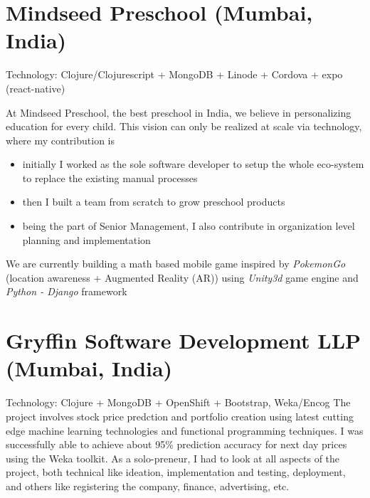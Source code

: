 \documentclass[11pt,a4paper,sans]{moderncv} %
\begin{document}
\section{Mindseed Preschool (Mumbai, India)}
         {}{Technology: Clojure/Clojurescript + MongoDB + Linode + Cordova + expo (react-native)}
         {At Mindseed Preschool, the best preschool in India, we believe in personalizing education for every child. This vision can only be realized at scale via technology, where my contribution is
           \begin{itemize}
           \item initially I worked as the sole software developer to setup the whole eco-system to replace the existing manual processes
           \item then I built a team from scratch to grow preschool products
           \item being the part of Senior Management, I also contribute in organization level planning and implementation
           \end{itemize}
         We are currently building a math based mobile game inspired by \textit{PokemonGo} (location awareness + Augmented Reality (AR)) using \textit{Unity3d} game engine and \textit{Python - Django} framework}

\section{Gryffin Software Development LLP (Mumbai, India)}
         {}{Technology: Clojure + MongoDB + OpenShift + Bootstrap, Weka/Encog}
         {The project involves stock price predction and portfolio creation using latest cutting edge machine learning technologies and functional programming techniques. I was successfully able to achieve about 95\% prediction accuracy for next day prices using the Weka toolkit. As a solo-preneur, I had to look at all aspects of the project, both technical like ideation, implementation and testing, deployment, and others like registering the company, finance, advertising, etc.}
\end{document}
